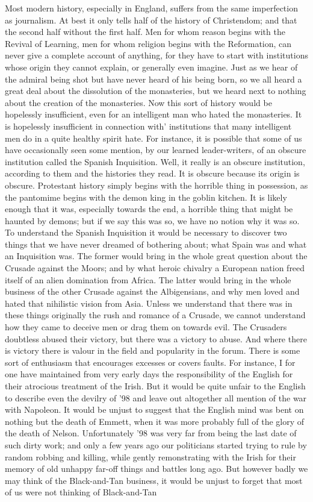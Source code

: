 \documentclass{book}
\begin{document}
Most modern history, especially in England, suffers from the same imperfection as journalism. At best it only tells half of the history of Christendom; and that the second half without the first half. Men for whom reason begins with the Revival of Learning, men for whom religion begins with the Reformation, can never give a complete account of anything, for they have to start with institutions whose origin they cannot explain, or generally even imagine. Just as we hear of the admiral being shot but have never heard of his being born, so we all heard a great deal about the dissolution of the monasteries, but we heard next to nothing about the creation of the monasteries. Now this sort of history would be hopelessly insufficient, even for an intelligent man who hated the monasteries. It is hopelessly insufficient in connection with’ institutions that many intelligent men do in a quite healthy spirit hate. For instance, it is possible that some of us have occasionally seen some mention, by our learned leader-writers, of an obscure institution called the Spanish Inquisition. Well, it really is an obscure institution, according to them and the histories they read. It is obscure because its origin is obscure. Protestant history simply begins with the horrible thing in possession, as the pantomime begins with the demon king in the goblin kitchen. It is likely enough that it was, especially towards the end, a horrible thing that might be haunted by demons; but if we say this was so, we have no notion why it was so. To understand the Spanish Inquisition it would be necessary to discover two things that we have never dreamed of bothering about; what Spain was and what an Inquisition was. The former would bring in the whole great question about the Crusade against the Moors; and by what heroic chivalry a European nation freed itself of an alien domination from Africa. The latter would bring in the whole business of the other Crusade against the Albigensians, and why men loved and hated that nihilistic vision from Asia. Unless we understand that there was in these things originally the rush and romance of a Crusade, we cannot understand how they came to deceive men or drag them on towards evil. The Crusaders doubtless abused their victory, but there was a victory to abuse. And where there is victory there is valour in the field and popularity in the forum. There is some sort of enthusiasm that encourages excesses or covers faults. For instance, I for one have maintained from very early days the responsibility of the English for their atrocious treatment of the Irish. But it would be quite unfair to the English to describe even the devilry of ’98 and leave out altogether all mention of the war with Napoleon. It would be unjust to suggest that the English mind was bent on nothing but the death of Emmett, when it was more probably full of the glory of the death of Nelson. Unfortunately ’98 was very far from being the last date of such dirty work; and only a few years ago our politicians started trying to rule by random robbing and killing, while gently remonstrating with the Irish for their memory of old unhappy far-off things and battles long ago. But however badly we may think of the Black-and-Tan business, it would be unjust to forget that most of us were not thinking of Black-and-Tan 
\end{document}
